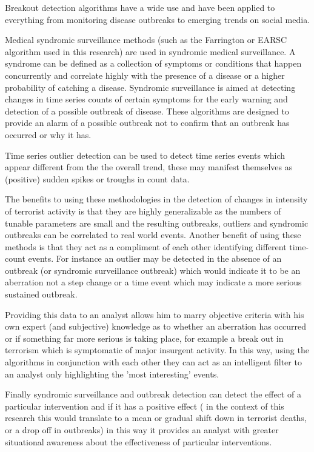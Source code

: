 Breakout detection algorithms have a wide use and have been applied to everything from monitoring disease outbreaks to emerging trends on social media.

Medical syndromic surveillance methods (such as the Farrington or EARSC algorithm used in this research) are used in syndromic medical surveillance. A syndrome can be defined as a collection of symptoms or conditions that happen concurrently and correlate highly with the presence of a disease or a higher probability of catching a disease. Syndromic surveillance is aimed at detecting changes in time series counts of certain symptoms for the early warning and detection of a possible outbreak of disease. These algorithms are designed to provide an alarm of a possible outbreak not to confirm that an outbreak has occurred or why it has.

Time series outlier detection can be used to detect time series events which appear different from the the overall trend, these may manifest themselves as (positive) sudden spikes or troughs in count data.

The benefits to using these methodologies in the detection of changes in intensity of terrorist activity is that they are highly generalizable as the numbers of tunable parameters are small and the resulting outbreaks, outliers and syndromic outbreaks can be correlated to real world events. Another benefit of using these methods is that they act as a compliment of each other
identifying different time-count events. For instance an outlier may be detected in the absence of an outbreak (or syndromic surveillance outbreak) which would indicate it to be an aberration not a step change or a time event which may indicate a more serious sustained outbreak.

Providing this data to an analyst allows him to marry objective criteria with his own expert (and subjective) knowledge as to whether an aberration has occurred or if something far more serious is taking place, for example a break out in terrorism which is symptomatic of major insurgent activity. In this way, using the algorithms in conjunction with each other they can act as an intelligent filter to an analyst only highlighting the 'most interesting' events. 

Finally syndromic surveillance and outbreak detection can detect the effect of a particular intervention and if it has a positive effect ( in the context of this research this would translate to a mean or gradual shift down in terrorist deaths, or a drop off in outbreaks) in this  way it provides an analyst with greater situational awareness about the effectiveness of particular interventions. 

